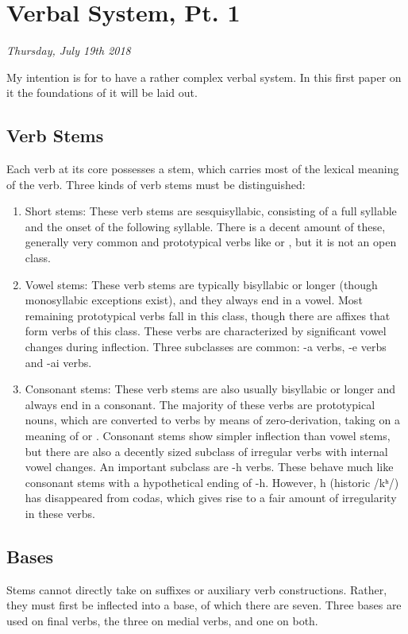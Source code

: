 \section{Verbal System, Pt. 1}
\emph{Thursday, July 19th 2018}

My intention is for \lang{} to have a rather complex verbal system. In this first paper on it the foundations of it will be laid out.

\subsection{Verb Stems}
Each verb at its core possesses a stem, which carries most of the lexical meaning of the verb. Three kinds of verb stems must be distinguished:

\begin{enumerate}
	\item Short stems: These verb stems are sesquisyllabic, consisting of a full syllable and the onset of the following syllable. There is a decent amount of these, generally very common and prototypical verbs like  or , but it is not an open class.
	\item Vowel stems: These verb stems are typically bisyllabic or longer (though monosyllabic exceptions exist), and they always end in a vowel. Most remaining prototypical verbs fall in this class, though there are affixes that form verbs of this class. These verbs are characterized by significant vowel changes during inflection. Three subclasses are common: -a verbs, -e verbs and -ai verbs. 
	\item Consonant stems: These verb stems are also usually bisyllabic or longer and always end in a consonant. The majority of these verbs are prototypical nouns, which are converted to verbs by means of zero-derivation, taking on a meaning of  or . Consonant stems show simpler inflection than vowel stems, but there are also a decently sized subclass of irregular verbs with internal vowel changes. An important subclass are -h verbs. These behave much like consonant stems with a hypothetical ending of -h. However, h (historic /kʰ/) has disappeared from codas, which gives rise to a fair amount of irregularity in these verbs. 
\end{enumerate}

\subsection{Bases}
Stems cannot directly take on suffixes or auxiliary verb constructions. Rather, they must first be inflected into a base, of which there are seven. Three bases are used on final verbs, the three on medial verbs, and one on both.

